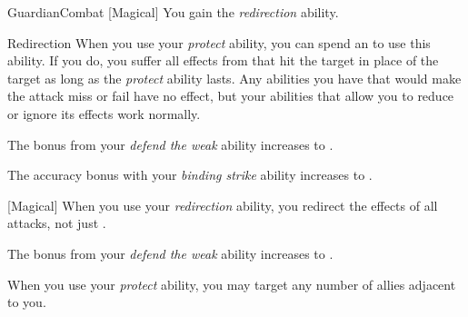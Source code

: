 \begin{feat}{Guardian}{Combat}
        [Magical] You gain the \textit{redirection} ability.
        \begin{ability}{Redirection}
            When you use your \textit{protect} ability, you can spend an  to use this ability.
            If you do, you suffer all effects from  that hit the target in place of the target as long as the \textit{protect} ability lasts.
            Any abilities you have that would make the attack miss or fail have no effect, but your abilities that allow you to reduce or ignore its effects work normally.
        \end{ability}

         The bonus from your \textit{defend the weak} ability increases to .

         The accuracy bonus with your \textit{binding strike} ability increases to .

        [Magical] When you use your \textit{redirection} ability, you redirect the effects of all attacks, not just .

         The bonus from your \textit{defend the weak} ability increases to .

         When you use your \textit{protect} ability, you may target any number of allies adjacent to you.
    \end{feat}

